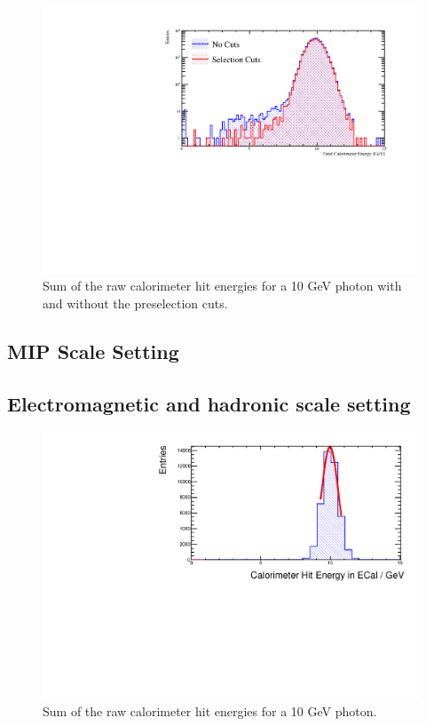 \begin{figure}
\includegraphics[width=\largefigwidth]{EnergyEstimators/Plots/Calibration/Digitsation/ECal/ECalDigiCuts.pdf}
  \caption[Sum of the raw calorimeter hit energies for a 10 GeV photon with and without the preselection cuts.]{Sum of the raw calorimeter hit energies for a 10 GeV photon with and without the preselection cuts.}
  \label{engest:fig:cutsphotondigi}
\end{figure}

\subsection{MIP Scale Setting}


\subsection{Electromagnetic and hadronic scale setting}




\begin{figure}
  \includegraphics[width=\largefigwidth]{EnergyEstimators/Plots/Calibration/ECalDigitsation.pdf}
  \caption[Sum of the raw calorimeter hit energies for a 10 GeV photon.]{Sum of the raw calorimeter hit energies for a 10 GeV photon.}
  \label{engest:fig:ecaldigi}
\end{figure}




